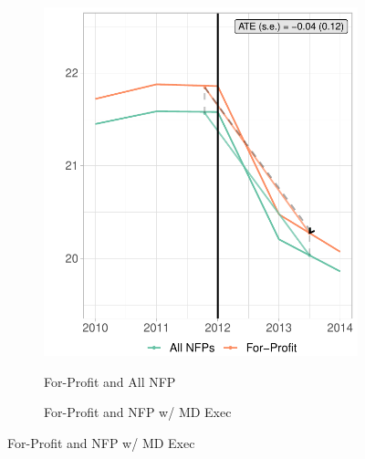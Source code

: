 \documentclass[12pt]{article}
\begin{document}
     \begin{figure}
     \caption{Readmission Rate Synthetic Difference in Differences Results}
     \centering
          \begin{subfigure}[b]{0.45\textwidth}
         \centering
         \caption{For-Profit and All NFP}
         \includegraphics[width=\textwidth]{Objects/read_fp_nfp_synth_graph.pdf}
         \label{fig:read_synth_plota}
     \end{subfigure}%
     \hfill
     \begin{subfigure}[b]{0.45\textwidth}
         \centering
         \caption{For-Profit and NFP w/ MD Exec}

\end{subfigure}
\end{figure}
\end{document}
